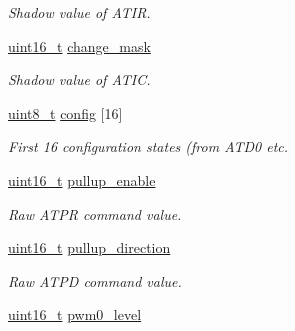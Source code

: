\begin{DoxyCompactItemize}
\begin{DoxyCompactList}\small\item\em Shadow value of A\-T\-I\-R. \end{DoxyCompactList}\item 
\hypertarget{group__xbee__io_ga2502e2e5a62801d202ac0cb63e546e46}{\hyperlink{group__hal_ga5a8b2dc9e45a9ee81a94ef304fb62505}{uint16\-\_\-t} \hyperlink{group__xbee__io_ga2502e2e5a62801d202ac0cb63e546e46}{change\-\_\-mask}}\label{group__xbee__io_ga2502e2e5a62801d202ac0cb63e546e46}

\begin{DoxyCompactList}\small\item\em Shadow value of A\-T\-I\-C. \end{DoxyCompactList}\item 
\hyperlink{group__hal_gae1affc9ca37cfb624959c866a73f83c2}{uint8\-\_\-t} \hyperlink{group__xbee__io_ga46d8dea1f8c2a731faf0db27d6ed308f}{config} \mbox{[}16\mbox{]}
\begin{DoxyCompactList}\small\item\em First 16 configuration states (from A\-T\-D0 etc. \end{DoxyCompactList}\item 
\hypertarget{group__xbee__io_ga059172dae4cbb97d22755682ec824079}{\hyperlink{group__hal_ga5a8b2dc9e45a9ee81a94ef304fb62505}{uint16\-\_\-t} \hyperlink{group__xbee__io_ga059172dae4cbb97d22755682ec824079}{pullup\-\_\-enable}}\label{group__xbee__io_ga059172dae4cbb97d22755682ec824079}

\begin{DoxyCompactList}\small\item\em Raw A\-T\-P\-R command value. \end{DoxyCompactList}\item 
\hypertarget{group__xbee__io_gaa1b20f291d5ad3201dbf1d3ff9aae9f2}{\hyperlink{group__hal_ga5a8b2dc9e45a9ee81a94ef304fb62505}{uint16\-\_\-t} \hyperlink{group__xbee__io_gaa1b20f291d5ad3201dbf1d3ff9aae9f2}{pullup\-\_\-direction}}\label{group__xbee__io_gaa1b20f291d5ad3201dbf1d3ff9aae9f2}

\begin{DoxyCompactList}\small\item\em Raw A\-T\-P\-D command value. \end{DoxyCompactList}\item 
\hypertarget{group__xbee__io_gac20a5cb3031dfc972e4a7fcb21e7face}{\hyperlink{group__hal_ga5a8b2dc9e45a9ee81a94ef304fb62505}{uint16\-\_\-t} \hyperlink{group__xbee__io_gac20a5cb3031dfc972e4a7fcb21e7face}{pwm0\-\_\-level}}\label{group__xbee__io_gac20a5cb3031dfc972e4a7fcb21e7face}


\end{DoxyCompactItemize}
